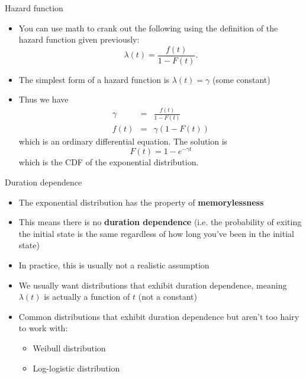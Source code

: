 \documentclass[english,xcolor=dvipsnames]{beamer}
\begin{document}
\begin{frame}{Hazard function}
\begin{itemize}
\item You can use math to crank out the following using the definition of
the hazard function given previously:
\[
\lambda\left(t\right)=\frac{f\left(t\right)}{1-F\left(t\right)}.
\]

\item The simplest form of a hazard function is $\lambda\left(t\right)=\gamma$
(some constant)
\item Thus we have
\begin{eqnarray*}
\gamma & = & \frac{f\left(t\right)}{1-F\left(t\right)}\\
f\left(t\right) & = & \gamma\left(1-F\left(t\right)\right)
\end{eqnarray*}
which is an ordinary differential equation. The solution is
\[
F\left(t\right)=1-e^{-\gamma t}
\]
which is the CDF of the exponential distribution.
\end{itemize}

\end{frame}


\begin{frame}{Duration dependence}
\begin{itemize}
\item The exponential distribution has the property of \textbf{memorylessness}
\item This means there is no \textbf{duration dependence} (i.e. the probability
of exiting the initial state is the same regardless of how long you've
been in the initial state)
\item In practice, this is usually not a realistic assumption
\item We usually want distributions that exhibit duration dependence, meaning
$\lambda\left(t\right)$ is actually a function of $t$ (not a constant)
\item Common distributions that exhibit duration dependence but aren't too
hairy to work with:

\begin{itemize}
\item Weibull distribution
\item Log-logistic distribution
\end{itemize}
\end{itemize}

\end{frame}
\end{document}
